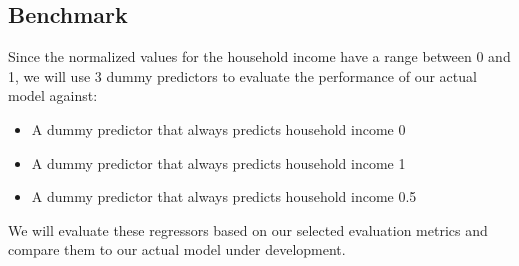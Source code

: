 \documentclass{article}
\begin{document}
\subsection{Benchmark}
Since the normalized values for the household income have a range between 0 and 1, we will use 3 dummy predictors to evaluate the performance of our actual model against:
\begin{itemize}
  \item A dummy predictor that always predicts household income 0
  \item A dummy predictor that always predicts household income 1
  \item A dummy predictor that always predicts household income 0.5
\end{itemize}
We will evaluate these regressors based on our selected evaluation metrics and compare them to our actual model under development.
\end{document}

